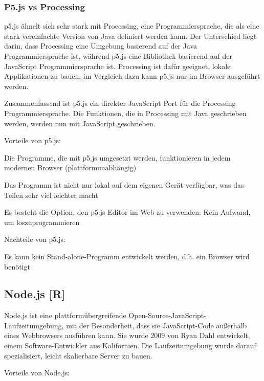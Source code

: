 \subsubsection{P5.js vs Processing}
p5.js ähnelt sich sehr stark mit Processing, eine Programmiersprache, die als eine stark vereinfachte Version von Java definiert werden kann.
Der Unterschied liegt darin, dass Processing eine Umgebung basierend auf der Java Programmiersprache ist, während p5.js eine Bibliothek basierend auf der JavaScript Programmiersprache ist.
Processing ist dafür geeignet, lokale Applikationen zu bauen, im Vergleich dazu kann p5.js nur im Browser ausgeführt werden.

Zusammenfassend ist p5.js ein direkter JavaScript Port für die Processing Programmiersprache. Die Funktionen, die in Processing mit Java geschrieben werden, werden nun mit JavaScript geschrieben. \cite{p5_proc_difference}

Vorteile von p5.js:
\begin{compactitem}
    \item Die Programme, die mit p5.js umgesetzt werden, funktionieren in jedem modernen Browser (plattformunabhängig)
    \item Das Programm ist nicht nur lokal auf dem eigenen Gerät verfügbar, was das Teilen sehr viel leichter macht
    \item Es besteht die Option, den p5.js Editor im Web zu verwenden: Kein Aufwand, um loszuprogrammieren
\end{compactitem}

Nachteile von p5.js:
\begin{compactitem}
    \item Es kann kein Stand-alone-Programm entwickelt werden, d.h. ein Browser wird benötigt
\end{compactitem}


\subsection {Node.js [R]}
Node.js ist eine plattformübergreifende Open-Source-JavaScript-Laufzeitumgebung, mit der Besonderheit, dass sie JavaScript-Code außerhalb eines Webbrowsers ausführen kann.
Sie wurde 2009 von Ryan Dahl entwickelt, einem Software-Entwickler aus Kalifornien.
Die Laufzeitumgebung wurde darauf spezialisiert, leicht skalierbare Server zu bauen. \cite{nodejs}

Vorteile von Node.js: \cite{nodejs_vorteile}

